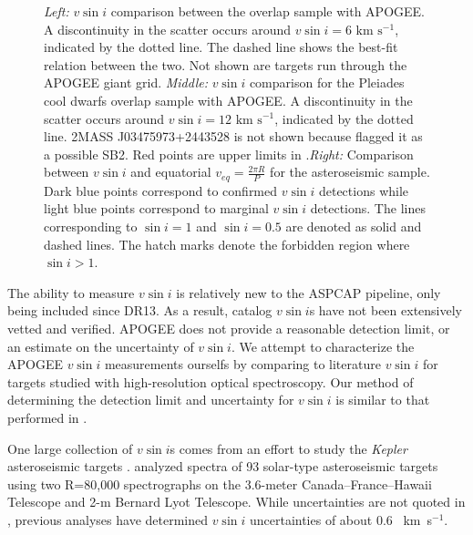 \documentclass[manuscript]{aastex6}
\newcommand{\vsini}{\ensuremath{v \sin i}}
\newcommand{\Kepler}{\mbox{\textit{Kepler}}}
\newcommand{\kms}{\textrm{~km~s}\ensuremath{^{-1}}}
\begin{document}
\begin{figure*}
    \caption{\emph{Left:} \vsini{} comparison between the \citet{Bruntt12}
        overlap sample with APOGEE\@. A discontinuity in the scatter occurs
        around \(\vsini = 6 \kms\), indicated by the dotted line. The dashed
    line shows the best-fit relation between the two. Not shown are targets 
    run through the APOGEE giant grid. \emph{Middle:} \vsini{} comparison for 
    the Pleiades cool dwarfs \citep{Stauffer87} overlap sample with APOGEE\@. 
    A discontinuity in the scatter occurs around \(\vsini = 12 \kms\), 
    indicated by the dotted line. 2MASS J03475973+2443528 is not shown
    because \citet{Stauffer87} flagged it as a possible SB2. Red points are 
    upper limits in \citet{Stauffer87}.\emph{Right:} Comparison between
    \vsini{} and equatorial \(v_{eq} = \frac{2\pi R}{P}\) for the 
    asteroseismic sample. Dark blue points correspond to confirmed
    \vsini{} detections while light blue points correspond to marginal
    \vsini{} detections. The lines corresponding to \(\sin i = 1\) and
    \(\sin i = 0.5\) are denoted as solid and dashed lines. The hatch
    marks denote the forbidden region where \(\sin i > 1\).\label{fig:comps}}
\end{figure*}


The ability to measure \vsini{} is relatively new to the ASPCAP pipeline, only
being included since DR13. As a result, catalog \vsini{}s have not been 
extensively vetted and verified. APOGEE does not provide a reasonable
detection limit, or an estimate on the uncertainty of \vsini{}. We
attempt to characterize the APOGEE \vsini{} measurements ourselfs
by comparing to literature \vsini{} for targets studied with high-resolution 
optical spectroscopy. Our method of determining the detection limit and
uncertainty for \vsini{} is similar to that performed in
\citet{Tayar15}.

One large collection of \vsini{}s comes from an effort to study the
\Kepler{} asteroseismic targets \citep{Bruntt12}. \citet{Bruntt12} analyzed 
spectra of 93 solar-type asteroseismic targets using two R=80,000 spectrographs 
on the 3.6-meter Canada--France--Hawaii Telescope and 2-m Bernard Lyot
Telescope. While uncertainties are not quoted in \citet{Bruntt12},
previous analyses have determined \vsini{} uncertainties of about 0.6
\kms \citep{Bruntt10a,Bruntt10b}.
\end{document}
